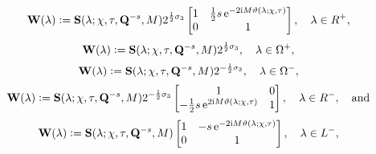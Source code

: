 \begin{equation}
\mathbf{W}(\lambda)\vcentcolon=\mathbf{S}(\lambda;\chi,\tau,\mathbf{Q}^{-s},M)2^{\frac{1}{2}\sigma_3}\begin{bmatrix}1 & \tfrac{1}{2}s\,\mathrm{e}^{-2\mathrm{i} M\vartheta(\lambda;\chi,\tau)}\\ 0 & 1\end{bmatrix},\quad\lambda\in R^+,
\label{eq:T-S-R-plus-ALT}
\end{equation}
\begin{equation}
\mathbf{W}(\lambda)\vcentcolon=\mathbf{S}(\lambda;\chi,\tau,\mathbf{Q}^{-s},M)2^{\frac{1}{2}\sigma_3},\quad
\lambda\in\Omega^+,
\end{equation}
\begin{equation}
\mathbf{W}(\lambda)\vcentcolon=\mathbf{S}(\lambda;\chi,\tau,\mathbf{Q}^{-s},M)2^{-\frac{1}{2}\sigma_3},\quad
\lambda\in\Omega^-,
\end{equation}
\begin{equation}
\mathbf{W}(\lambda)\vcentcolon=\mathbf{S}(\lambda;\chi,\tau,\mathbf{Q}^{-s},M)2^{-\frac{1}{2}\sigma_3}\begin{bmatrix} 1 & 0\\-\tfrac{1}{2}s\,\mathrm{e}^{2\mathrm{i} M\vartheta(\lambda;\chi,\tau)} & 1\end{bmatrix},\quad\lambda\in R^-,\quad\text{and}
\label{eq:T-S-R-minus-ALT}
\end{equation}
\begin{equation}
\mathbf{W}(\lambda)\vcentcolon=\mathbf{S}(\lambda;\chi,\tau,\mathbf{Q}^{-s},M)\begin{bmatrix}
1 & -s\,\mathrm{e}^{-2\mathrm{i} M\vartheta(\lambda;\chi,\tau)}\\ 0 & 1\end{bmatrix},\quad
\lambda\in L^-,
\label{eq:T-S-L-minus-ALT}
\end{equation}
